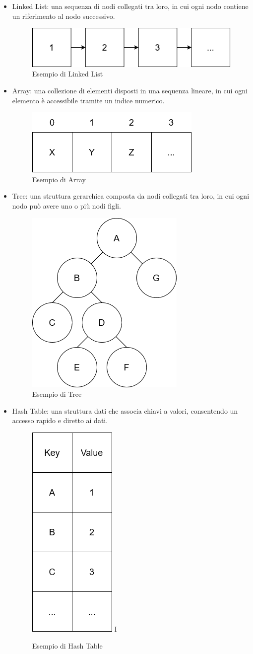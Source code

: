 \documentclass[12pt,a4paper,openright,twoside]{book}
\begin{document}
        \begin{itemize}
            \item Linked List: una sequenza di nodi collegati tra loro, in cui ogni nodo contiene un riferimento al nodo successivo.
            \begin{figure} [h]
                \centering
                \includegraphics[width=.4\linewidth]{figures/LinkedList.png}
                \caption{Esempio di Linked List}
                \label{fig:linked-list}
            \end{figure}
            \item Array: una collezione di elementi disposti in una sequenza lineare, in cui ogni elemento è accessibile tramite un indice numerico.
            \begin{figure} [h]
                \centering
                \includegraphics[width=.3\linewidth]{figures/Array.png}
                \caption{Esempio di Array}
                \label{fig:array}
            \end{figure}
            \item Tree: una struttura gerarchica composta da nodi collegati tra loro, in cui ogni nodo può avere uno o più nodi figli.
            \begin{figure} [h]
                \centering
                \includegraphics[width=.2\linewidth]{figures/Tree.png}
                \caption{Esempio di Tree}
                \label{fig:generic-tree}
            \end{figure}
            \item Hash Table: una struttura dati che associa chiavi a valori, consentendo un accesso rapido e diretto ai dati.
            \begin{figure} [h]
                \centering
                \includegraphics[width=.15\linewidth]{figures/HashTable.png}
I              \caption{Esempio di Hash Table}
                \label{fig:hash-table}
            \end{figure}
        \end{itemize}
\end{document}
